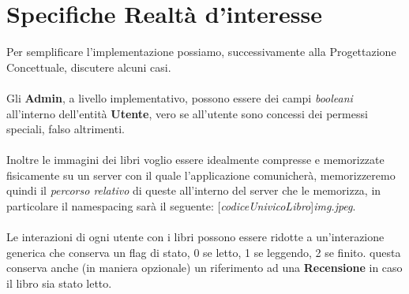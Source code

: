 \documentclass{article}
\begin{document}
\section{Specifiche Realtà d'interesse}
Per semplificare l'implementazione possiamo, successivamente alla Progettazione Concettuale, discutere alcuni
casi.
\\\\
Gli \textbf{Admin}, a livello implementativo, possono essere dei campi \textit{booleani} all'interno dell'entità \textbf{Utente}, vero se
all'utente sono concessi dei permessi speciali, falso altrimenti.\\\\
Inoltre le immagini dei libri voglio essere idealmente compresse e memorizzate fisicamente su un server con il quale l'applicazione
comunicherà, memorizzeremo quindi il \textit{percorso relativo} di queste all'interno del server che le memorizza, in particolare
il namespacing sarà il seguente: [\textit{codiceUnivicoLibro}]\textit{img.jpeg}.
\\\\
Le interazioni di ogni utente con i libri possono essere ridotte a un'interazione generica che conserva un flag di stato, 0 se letto, 1 se leggendo, 2 se finito.
questa conserva anche (in maniera opzionale) un riferimento ad una \textbf{Recensione} in caso il libro sia stato letto.
\end{document}
